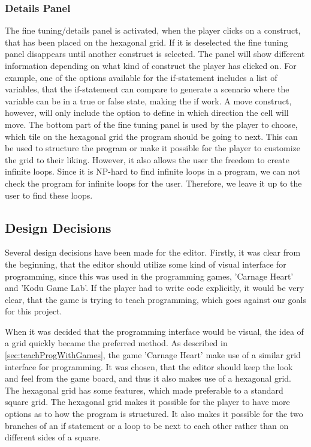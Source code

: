 \subsubsection*{Details Panel}
The fine tuning/details panel is activated, when the player clicks on a construct, that has been placed on the hexagonal grid.
If it is deselected the fine tuning panel disappears until another construct is selected.
The panel will show different information depending on what kind of construct the player has clicked on.
For example, one of the options available for the if-statement includes a list of variables, that the if-statement can compare to generate a scenario where the variable can be in a true or false state, making the if work.
A move construct, however, will only include the option to define in which direction the cell will move.
The bottom part of the fine tuning panel is used by the player to choose, which tile on the hexagonal grid the program should be going to next.
This can be used to structure the program or make it possible for the player to customize the grid to their liking.
However, it also allows the user the freedom to create infinite loops.
Since it is NP-hard to find infinite loops in a program, we can not check the program for infinite loops for the user.
Therefore, we leave it up to the user to find these loops. 

\subsection{Design Decisions}
Several design decisions have been made for the editor.
Firstly, it was clear from the beginning, that the editor should utilize some kind of visual interface for programming, since this was used in the programming games, 'Carnage Heart' and 'Kodu Game Lab'.
If the player had to write code explicitly, it would be very clear, that the game is trying to teach programming, which goes against our goals for this project.\newline

When it was decided that the programming interface would be visual, the idea of a grid quickly became the preferred method.
As described in \autoref{sec:teachProgWithGames}, the game 'Carnage Heart' make use of a similar grid interface for programming.
It was chosen, that the editor should keep the look and feel from the game board, and thus it also makes use of a hexagonal grid.
The hexagonal grid has some features, which made preferable to a standard square grid.
The hexagonal grid makes it possible for the player to have more options as to how the program is structured.
It also makes it possible for the two branches of an if statement or a loop to be next to each other rather than on different sides of a square.\newline

